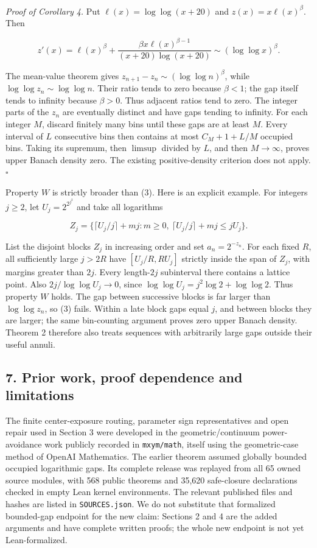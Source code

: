 \documentclass[
  11pt,
]{article}
\begin{document}
\emph{Proof of Corollary 4.} Put \(\ell (x)=\log\log (x+20)\) and
\(z(x)=x \ell (x)^\beta\). Then

\[
 z'(x)=\ell(x)^\beta+
 \frac{\beta x\ell(x)^{\beta-1}}{(x+20)\log(x+20)}
       \sim(\log\log x)^\beta.                              \tag{27}
\]

The mean-value theorem gives \(z_{n+1}-z_n\sim (\log\log  n)^\beta\),
while \(\log\log  z_n\sim \log\log  n\). Their ratio tends to zero
because \(\beta <1\); the gap itself tends to infinity because
\(\beta >0\). Thus adjacent ratios tend to zero. The integer parts of
the \(z_n\) are eventually distinct and have gaps tending to infinity.
For each integer \(M\), discard finitely many bins until these gaps are
at least \(M\). Every interval of \(L\) consecutive bins then contains
at most \(C_M+1+L/M\) occupied bins. Taking its supremum, then
\(\limsup\) divided by \(L\), and then \(M\to \infty\), proves upper
Banach density zero. The existing positive-density criterion does not
apply. \(\square\)

Property \(W\) is strictly broader than (3). Here is an explicit
example. For integers \(j\ge 2\), let \(U_j=2^{2^{j^2}}\) and take all
logarithms

\[
 Z_j=\{\lceil U_j/j\rceil+mj:m\ge0,
                    \ \lceil U_j/j\rceil+mj\le jU_j\}.     \tag{28}
\]

List the disjoint blocks \(Z_j\) in increasing order and set
\(a_n=2^{-z_n}\). For each fixed \(R\), all sufficiently large \(j>2R\)
have \([U_j/R,RU_j]\) strictly inside the span of \(Z_j\), with margins
greater than \(2j\). Every length-\(2j\) subinterval there contains a
lattice point. Also \(2j/\log\log  U_j\to 0\), since
\(\log\log  U_j=j^2 \log 2+\log\log 2\). Thus property \(W\) holds. The
gap between successive blocks is far larger than \(\log\log  z_n\), so
(3) fails. Within a late block gaps equal \(j\), and between blocks they
are larger; the same bin-counting argument proves zero upper Banach
density. Theorem 2 therefore also treats sequences with arbitrarily
large gaps outside their useful annuli.

\subsection{7. Prior work, proof dependence and
limitations}\label{prior-work-proof-dependence-and-limitations}

The finite center-exposure routing, parameter sign representatives and
open repair used in Section 3 were developed in the geometric/continuum
power-avoidance work publicly recorded in \texttt{mxym/math}, itself
using the geometric-case method of OpenAI Mathematics. The earlier
theorem assumed globally bounded occupied logarithmic gaps. Its complete
release was replayed from all 65 owned source modules, with 568 public
theorems and 35,620 safe-closure declarations checked in empty Lean
kernel environments. The relevant published files and hashes are listed
in \texttt{SOURCES.json}. We do not substitute that formalized
bounded-gap endpoint for the new claim: Sections 2 and 4 are the added
arguments and have complete written proofs; the whole new endpoint is
not yet Lean-formalized.
\end{document}
